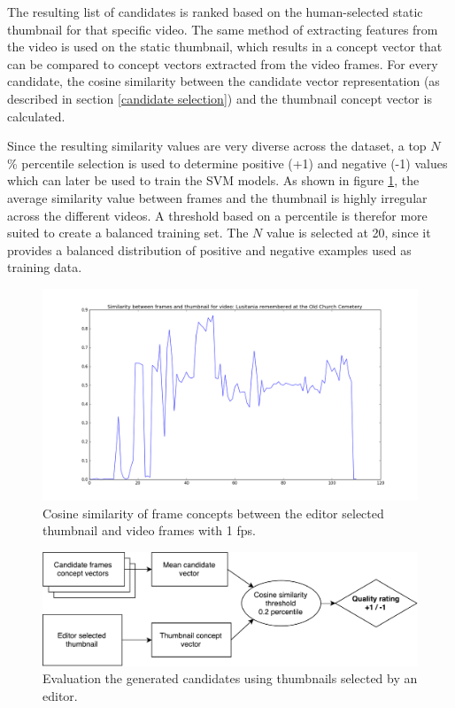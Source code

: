 \documentclass{../resources/sig-alternate-05-2015}
\begin{document}

The resulting list of candidates is ranked based on the human-selected static thumbnail for that specific video. The same method of extracting features from the video is used on the static thumbnail, which results in a concept vector that can be compared to concept vectors extracted from the video frames. For every candidate, the cosine similarity between the candidate vector representation (as described in section \ref{candidate selection}) and the thumbnail concept vector is calculated. 

Since the resulting similarity values are very diverse across the dataset, a top $N$ \% percentile selection is used to determine positive (+1) and negative (-1) values which can later be used to train the SVM models. As shown in figure \ref{thumbnail similarity}, the average similarity value between frames and the thumbnail is highly irregular across the different videos. A threshold based on a percentile is therefor more suited to create a balanced training set. The $N$ value is selected at 20, since it provides a balanced distribution of positive and negative examples used as training data.

\begin{figure}[h]
  \label{thumbnail similarity}
  \includegraphics[width=\linewidth]{resources/thumbnail-similarity}
  \caption{Cosine similarity of frame concepts between the editor selected thumbnail and video frames with 1 fps.}
\end{figure}

\begin{figure}[h]
  \label{candidate evaluation scheme}
  \includegraphics[width=\linewidth]{resources/candidate-evaluation}
  \caption{Evaluation the generated candidates using thumbnails selected by an editor.}
\end{figure}
\end{document}
